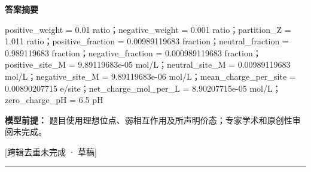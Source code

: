 \documentclass[UTF8,11pt,a4paper]{ctexart}
\begin{document}
\noindent\textbf{答案摘要}\par
positive\_weight = 0.01 ratio；negative\_weight = 0.001 ratio；partition\_Z = 1.011 ratio；positive\_fraction = 0.00989119683 fraction；neutral\_fraction = 0.989119683 fraction；negative\_fraction = 0.000989119683 fraction；positive\_site\_M = 9.89119683e-05 mol/L；neutral\_site\_M = 0.00989119683 mol/L；negative\_site\_M = 9.89119683e-06 mol/L；mean\_charge\_per\_site = 0.00890207715 e/site；net\_charge\_mol\_per\_L = 8.90207715e-05 mol/L；zero\_charge\_pH = 6.5 pH\par
\noindent\textbf{模型前提：}
题目使用理想位点、弱相互作用及所声明价态；专家学术和原创性审阅未完成。\par
\noindent\textcolor{red!65!black}{[跨辑去重未完成 · 草稿]} \par
\medskip\hrule\medskip
{}
\end{document}
